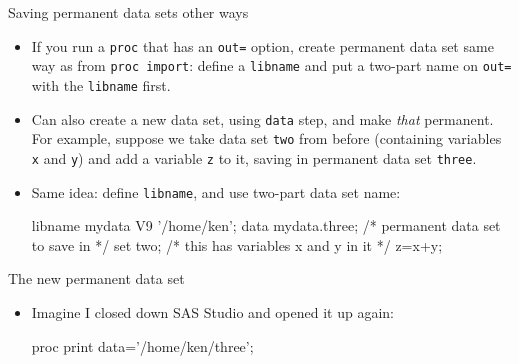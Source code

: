 \documentclass[unknownkeysallowed]{beamer}\usepackage[]{graphicx}\usepackage[]{color}
\begin{document}
\begin{frame}[fragile]{Saving permanent data sets other ways}
  
  \begin{itemize}
  \item If you run a \texttt{proc} that has an \texttt{out=} option,
    create permanent data set same way as from \texttt{proc import}:
    define a \texttt{libname} and put a two-part name on \texttt{out=}
    with the \texttt{libname} first.
  \item Can also create a new data set, using \texttt{data} step, and
    make \emph{that} permanent. For example, suppose we take data set
    \texttt{two} from before (containing variables \texttt{x} and
    \texttt{y}) and add a variable \texttt{z} to it, saving in
    permanent data set \texttt{three}.
  \item Same idea: define \texttt{libname}, and use
    two-part data set name:
    
    \begin{footnotesize}
  \begin{Datastep}
libname mydata V9 '/home/ken';    
data mydata.three; /* permanent data set to save in */
  set two; /* this has variables x and y in it */
  z=x+y;
  \end{Datastep}
      
    \end{footnotesize}
    
  \end{itemize}
  
\end{frame}

\begin{frame}[fragile]{The new permanent data set}
  
  \begin{itemize}
  \item Imagine I closed down SAS Studio and opened it up again:
    
    \begin{Sascode}[store=me]
proc print data='/home/ken/three';
    \end{Sascode}
    
  \end{itemize}
  
\end{frame}
\end{document}
